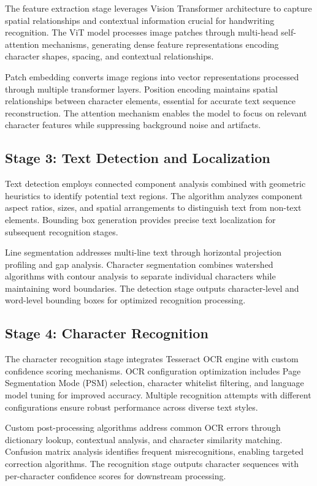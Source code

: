 \documentclass[10pt,twocolumn]{article}
\begin{document}
The feature extraction stage leverages Vision Transformer architecture to capture spatial relationships and contextual information crucial for handwriting recognition. The ViT model processes image patches through multi-head self-attention mechanisms, generating dense feature representations encoding character shapes, spacing, and contextual relationships.

Patch embedding converts image regions into vector representations processed through multiple transformer layers. Position encoding maintains spatial relationships between character elements, essential for accurate text sequence reconstruction. The attention mechanism enables the model to focus on relevant character features while suppressing background noise and artifacts.

\subsection{Stage 3: Text Detection and Localization}

Text detection employs connected component analysis combined with geometric heuristics to identify potential text regions. The algorithm analyzes component aspect ratios, sizes, and spatial arrangements to distinguish text from non-text elements. Bounding box generation provides precise text localization for subsequent recognition stages.

Line segmentation addresses multi-line text through horizontal projection profiling and gap analysis. Character segmentation combines watershed algorithms with contour analysis to separate individual characters while maintaining word boundaries. The detection stage outputs character-level and word-level bounding boxes for optimized recognition processing.

\subsection{Stage 4: Character Recognition}

The character recognition stage integrates Tesseract OCR engine with custom confidence scoring mechanisms. OCR configuration optimization includes Page Segmentation Mode (PSM) selection, character whitelist filtering, and language model tuning for improved accuracy. Multiple recognition attempts with different configurations ensure robust performance across diverse text styles.

Custom post-processing algorithms address common OCR errors through dictionary lookup, contextual analysis, and character similarity matching. Confusion matrix analysis identifies frequent misrecognitions, enabling targeted correction algorithms. The recognition stage outputs character sequences with per-character confidence scores for downstream processing.
\end{document}
